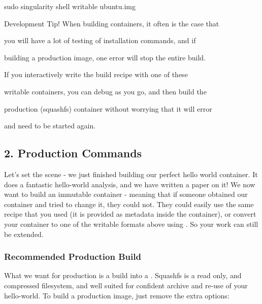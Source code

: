\documentclass[letterpaper,10pt,english]{sphinxmanual}
\begin{document}
%
\begin{sphinxVerbatim}[commandchars=\\\{\}]
\PYGZdl{} sudo singularity shell \PYGZhy{}\PYGZhy{}writable ubuntu.img


Development Tip! When building containers, it often is the case that

you will have a lot of testing of installation commands, and if

building a production image, one error will stop the entire build.

If you interactively write the build recipe with one of these

writable containers, you can debug as you go, and then build the

production (squashfs) container without worrying that it will error

and need to be started again.
\end{sphinxVerbatim}


\subsection{2. Production Commands}
\label{\detokenize{singularity_flow:production-commands}}
Let’s set the scene - we just finished building our perfect hello world
container. It does a fantastic hello-world analysis, and we have written
a paper on it! We now want to build an immutable container - meaning
that if someone obtained our container and tried to change it, they
could not. They could easily use the same recipe that you used (it is
provided as metadata inside the container), or convert your container to
one of the writable formats above using  . So your work can still be
extended.


\subsubsection{Recommended Production Build}
\label{\detokenize{singularity_flow:recommended-production-build}}
What we want for production is a build into a  .
Squashfs is a read only, and compressed filesystem, and well suited for
confident archive and re-use of your hello-world. To build a production
image, just remove the extra options:
\end{document}
